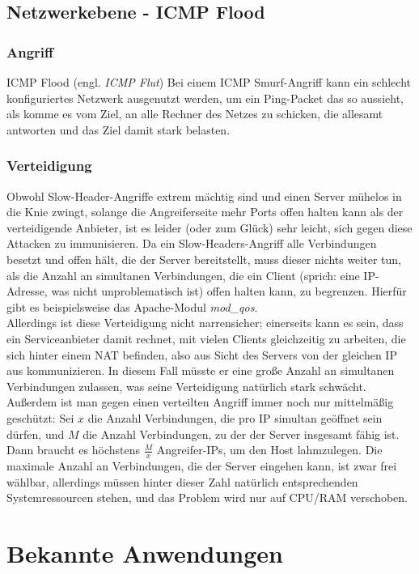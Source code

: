 \documentclass[12pt,a4paper]{article}
\begin{document}
\subsection{Netzwerkebene - ICMP Flood}
\subsubsection*{Angriff}
ICMP Flood (engl. \textit{ICMP Flut}) Bei einem ICMP Smurf-Angriff kann ein schlecht konfiguriertes Netzwerk ausgenutzt werden, um ein Ping-Packet das so aussieht, als komme es vom Ziel, an alle Rechner des Netzes zu schicken, die allesamt antworten und das Ziel damit stark belasten.
\subsubsection*{Verteidigung}
Obwohl Slow-Header-Angriffe extrem mächtig sind und einen Server mühelos in die Knie zwingt, solange die Angreiferseite mehr Ports offen halten kann als der verteidigende Anbieter, ist es leider (oder zum Glück) sehr leicht, sich gegen diese Attacken zu immunisieren. Da ein Slow-Headers-Angriff alle Verbindungen besetzt und offen hält, die der Server bereitstellt, muss dieser nichts weiter tun, als die Anzahl an simultanen Verbindungen, die ein Client (sprich: eine IP-Adresse, was nicht unproblematisch ist) offen halten kann, zu begrenzen. Hierfür gibt es beispielsweise das Apache-Modul \textit{mod\_qos}.\\
Allerdings ist diese Verteidigung nicht narrensicher; einerseits kann es sein, dass ein Serviceanbieter damit rechnet, mit vielen Clients gleichzeitig zu arbeiten, die sich hinter einem NAT befinden, also aus Sicht des Servers von der gleichen IP aus kommunizieren. In diesem Fall müsste er eine große Anzahl an simultanen Verbindungen zulassen, was seine Verteidigung natürlich stark schwächt. Außerdem ist man gegen einen verteilten Angriff immer noch nur mittelmäßig geschützt: Sei $x$ die Anzahl Verbindungen, die pro IP simultan geöffnet sein dürfen, und $M$ die Anzahl Verbindungen, zu der der Server insgesamt fähig ist. Dann braucht es höchstens $\frac{M}{x}$ Angreifer-IPs, um den Host lahmzulegen. Die maximale Anzahl an Verbindungen, die der Server eingehen kann, ist zwar frei wählbar, allerdings müssen hinter dieser Zahl natürlich entsprechenden Systemressourcen stehen, und das Problem wird nur auf CPU/RAM verschoben.
\section{Bekannte Anwendungen}
\end{document}

